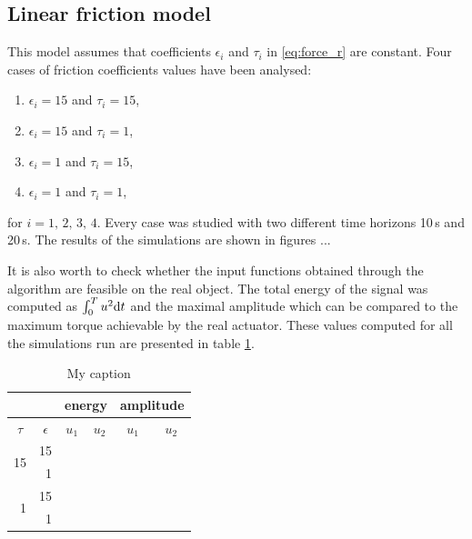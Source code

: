 \subsection{Linear friction model}
This model assumes that coefficients $\epsilon_i$ and $\tau_i$ in \eqref{eq:force_r} are constant. Four cases of friction coefficients values have been analysed:
\begin{enumerate}
\item $\epsilon_i=15$ and $\tau_i=15$,
\item $\epsilon_i=15$ and $\tau_i=1$,
\item $\epsilon_i=1$ and $\tau_i=15$,
\item $\epsilon_i=1$ and $\tau_i=1$,
\end{enumerate}
for $i=1,\,2,\,3,\,4$.
Every case was studied with two different time horizons 10\,s and 20\,s. The results of the simulations are shown in figures ...

It is also worth to check whether the input functions obtained through the algorithm are feasible on the real object. The total energy of the signal was computed as $\int_0^T u^2\mathrm{d} t$ and the maximal amplitude which can be compared to the maximum torque achievable by the real actuator. These values computed for all the simulations run are presented in table \ref{tab:control}.
\begin{table}[h]
\centering
\caption{My caption}
\label{tab:control} %
\begin{tabular}{rr|r|r|r|r|}
\cline{3-6}
\multicolumn{1}{c}{}                      & \multicolumn{1}{c|}{}           & \multicolumn{2}{c|}{energy}                             & \multicolumn{2}{c|}{amplitude}                          \\ \hline
\multicolumn{1}{|c|}{$\tau$}              & \multicolumn{1}{c|}{$\epsilon$} & \multicolumn{1}{c|}{$u_1$} & \multicolumn{1}{c|}{$u_2$} & \multicolumn{1}{c|}{$u_1$} & \multicolumn{1}{c|}{$u_2$} \\ \hline
\multicolumn{1}{|r|}{\multirow{2}{*}{15}} & 15                              &                            &                            &                            &                            \\ \cline{2-6} 
\multicolumn{1}{|r|}{}                    & 1                               &                            &                            &                            &                            \\ \hline
\multicolumn{1}{|r|}{\multirow{2}{*}{1}}  & 15                              &                            &                            &                            &                            \\ \cline{2-6} 
\multicolumn{1}{|r|}{}                    & 1                               &                            &                            &                            &                            \\ \hline
\end{tabular}
\end{table}


